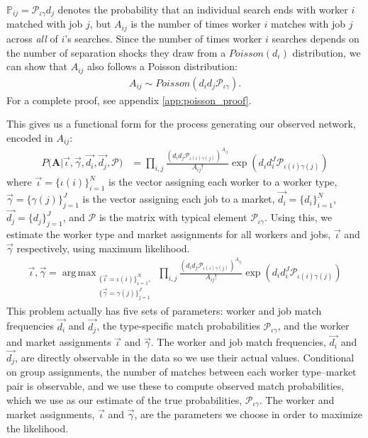 \documentclass[12pt]{article}
\def\ig{\iota\gamma}
\def\g{\gamma}
\def\i{\iota}
\DeclareMathOperator*{\argmax}{arg\,max}
\renewcommand{\P}{\mathbb {P}}
\theoremstyle{definition}
\theoremstyle{plain}
\begin{document}
$\P_{ij}=\mathcal{P}_{\ig} d_j$ denotes the probability that an individual search ends with worker $i$ matched with job $j$, but $A_{ij}$ is the number of times worker $i$ matches with job $j$ across \emph{all} of $i$'s searches. Since the number of times worker $i$ searches depends on the number of separation shocks they draw from a $Poisson(d_i)$ distribution, we can show that $A_{ij}$ also follows a Poisson distribution:
\begin{align}
 A_{ij} \sim  Poisson \left( d_i d_j \mathcal{P}_{\ig}  \right).
\end{align}
For a complete proof, see appendix \ref{app:poisson_proof}.

This gives us a functional form for the process generating our observed network, encoded in $A_{ij}$:
\begin{align} 
P \bigg(\mathbf{A} \bigg|\vec{\i}, \vec{\g}, \vec{d_i}, \vec{d_j} , \mathbf{\mathcal{P}} \bigg)  
&= \prod_{ i,j } \frac{\left(d_i d_j \mathcal{P}_{\i(i)\g(j)}\right)^{A_{ij}}}{A_{ij}!} \exp \left(d_i d_i^J \mathcal{P}_{\i(i)\g(j)} \right)  \label{eq:BiSBM}
\end{align} 
where $\vec{\i} = \{\i(i)\}_{i=1}^N $ is the vector assigning each worker to a worker type, $\vec{\g} = \{\g(j)\}_{j=1}^J$ is the vector assigning each job to a market, $\vec{d_i} = \{d_i\}_{i=1}^N$, $\vec{d_j} = \{d_j\}_{j=1}^J$,  and $\mathbf{\mathcal{P}}$ is the matrix with typical element $\mathcal{P}_{\i\g}$. Using this, we estimate the worker type and market assignments for all workers and jobs, $\vec{\i}$ and $\vec{\g}$ respectively, using maximum likelihood.
\begin{align}
\vec{\i},\vec{\g} = \argmax_{\begin{matrix} \{\vec{\i}=\i(i)\}_{i=1}^N, \\ \{\vec{\g}=\g(j)\}_{j=1}^J \end{matrix}}  \prod_{ i,j } \frac{\left(d_i d_j  \mathcal{P}_{\i(i)\g(j)}\right)^{A_{ij}}}{A_{ij}!} \exp \left(d_i d_i^J  \mathcal{P}_{\i(i)\g(j)}\right) \label{eq:BiSBM_max_likelihood}
\end{align}
This problem actually has five sets of parameters: worker and job match frequencies $\vec{d_i}$ and $\vec{d_j}$, the type-specific match probabilities $\mathcal{P}_{\ig}$, and the worker and market assignments $\vec{\i}$ and $\vec{\g}$. The worker and job match frequencies, $\vec{d_i}$ and $\vec{d_j}$, are directly observable in the data so we use their actual values. Conditional on group assignments, the number of matches between each worker type--market pair is observable, and we use these to compute observed match probabilities, which we use as our estimate of the true probabilities, $\mathcal{P}_{\ig}$. The worker and market assignments, $\vec{\i}$ and $\vec{\g}$, are the parameters we choose in order to maximize the likelihood. 
\end{document}
